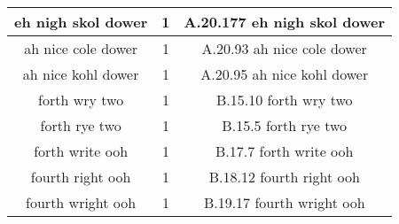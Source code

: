 \begin{center}
\begin{longtable}{|c|c|c|}
\hline 
eh nigh skol dower   & 1 & A.20.177    eh nigh skol dower  \\
\hline 
ah nice cole dower   & 1 & A.20.93    ah nice cole dower  \\
\hline 
ah nice kohl dower   & 1 & A.20.95    ah nice kohl dower  \\
\hline 
forth wry two   & 1 & B.15.10    forth wry two  \\
\hline 
forth rye two   & 1 & B.15.5    forth rye two  \\
\hline 
forth write ooh   & 1 & B.17.7    forth write ooh  \\
\hline 
fourth right ooh   & 1 & B.18.12    fourth right ooh  \\
\hline 
fourth wright ooh   & 1 & B.19.17    fourth wright ooh  \\
\hline

\end{longtable}

\end{center}



